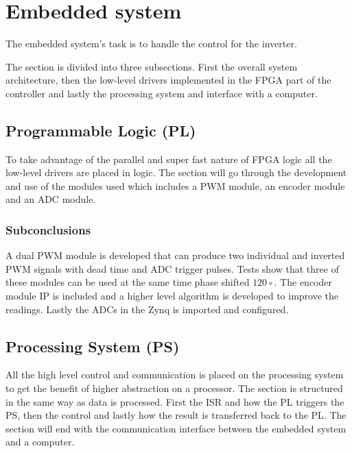 
\section{Embedded system}
\label{sec:embedded_system}
The embedded system's task is to handle the control for the inverter.

The section is divided into three subsections. First the overall system architecture, then the low-level drivers implemented in the FPGA part of the controller and lastly the processing system and interface with a computer. 






\subsection{Programmable Logic (PL)}
To take advantage of the parallel and super fast nature of FPGA logic all the low-level drivers are placed in logic. The section will go through the development and use of the modules used which includes a PWM module, an encoder module and an ADC module.







\subsubsection*{Subconclusions}
A dual PWM module is developed that can produce two individual and inverted PWM signals with dead time and ADC trigger pulses. Tests show that three of these modules can be used at the same time phase shifted $120\circ$. The encoder module IP is included and a higher level algorithm is developed to improve the readings. Lastly the ADCs in the Zynq is imported and configured.

\subsection{Processing System (PS)}
All the high level control and communication is placed on the processing system to get the benefit of higher abstraction on a processor. The section is structured in the same way as data is processed. First the ISR and how the PL triggers the PS, then the control and lastly how the result is transferred back to the PL. The section will end with the communication interface between the embedded system and a computer.


